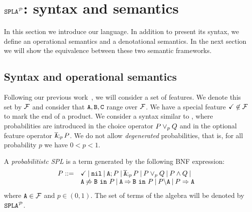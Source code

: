 \section{$\fodaPAp$: syntax and semantics}
\label{sec:stat:sintaxMain}
In this section we introduce our language. In addition to present its syntax, we define an operational semantics and a denotational semantics. In the next section we will show the equivalence between these two semantic frameworks.

\subsection{Syntax and operational semantics}
\label{sec:stat:sintax}
Following our previous work~\cite{acl13,cln16}, we will consider a
set of features. We denote this set by $\calF$ and consider that $\feature{A}, \feature{B},
\feature{C}$ range over $\calF$. We have a special feature
$\checkmark\not\in\calF$ to mark the end  of a product. We consider a syntax similar to
\fodaPA, where probabilities are introduced in the choice operator $P \choice_{p} Q $ and in
the optional feature operator $\ofeature{A};_{p} P$. We do not allow
\emph{degenerated} probabilities, that is, for all probability $p$ we have $0< p<1$.

\bdfn
\label{sec:stat:sintax:dfn}
A \emph{probabilitistc SPL} is a term generated by the following
BNF expression:
$$
\begin{array}{ll}
P::=& \checkmark \barra \nil \barra \feature{A};P \barra
\ofeature{A};_{p} P \barra P \choice_{p} Q \barra P \paral Q \barra
\\
& \exclude{A}{B}{P}\barra  \require{A}{B}{P}\barra  \forbid{A}{P}\barra  \mandatory{A}{P}\\
\end{array}
$$
\noindent
where $\feature{A} \in \calF$ and $p\in(0,1)$. The set of terms of the
algebra will be denoted by  $\fodaPAp$.
\edfn


